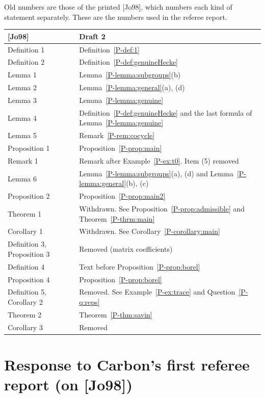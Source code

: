 \documentclass[12pt,letterpaper]{amsart}
\begin{document}
Old numbers are those of the printed [Jo98], which numbers each kind
of statement separately. These are the numbers used in the referee
report.

\begin{longtable}{@{}p{}p{}@{}}
\toprule
{[Jo98]} & Draft 2 \\
\midrule
\endhead
Definition 1 & Definition~\ref{P-def:1} \\
Definition 2 & Definition~\ref{P-def:genuineHecke} \\
Lemma 1 & Lemma~\ref{P-lemma:subgroups}(b) \\
Lemma 2 & Lemma~\ref{P-lemma:general}(a), (d) \\
Lemma 3 & Lemma~\ref{P-lemma:genuine} \\
Lemma 4 & Definition~\ref{P-def:genuineHecke} and the last formula of
Lemma~\ref{P-lemma:genuine} \\
Lemma 5 & Remark~\ref{P-rem:cocycle} \\
Proposition 1 & Proposition~\ref{P-prop:main} \\
Remark 1 & Remark after Example~\ref{P-ex:t0}. Item (5) removed \\
Lemma 6 & Lemma~\ref{P-lemma:subgroups}(a), (d) and
Lemma~\ref{P-lemma:general}(b), (c) \\
Proposition 2 & Proposition~\ref{P-prop:main2} \\
Theorem 1 & Withdrawn. See Proposition~\ref{P-prop:admissible} and
Theorem~\ref{P-thrm:main} \\
Corollary 1 & Withdrawn. See Corollary~\ref{P-corollary:main} \\
Definition 3, Proposition 3 & Removed (matrix coefficients) \\
Definition 4 & Text before Proposition~\ref{P-prop:borel} \\
Proposition 4 & Proposition~\ref{P-prop:borel} \\
Definition 5, Corollary 2 & Removed. See Example~\ref{P-ex:trace} and
Question~\ref{P-q:reps} \\
Theorem 2 & Theorem~\ref{P-thm:savin} \\
Corollary 3 & Removed \\
\bottomrule
\end{longtable}

\section{Response to Carbon's first referee report (on [Jo98])}
\label{sec:referee}
\end{document}
